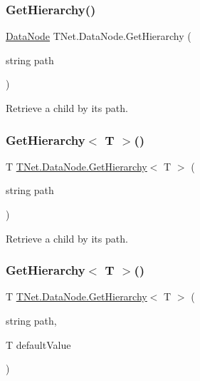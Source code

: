 \subsubsection{\texorpdfstring{Get\+Hierarchy()}{GetHierarchy()}}
{\footnotesize\ttfamily \mbox{\hyperlink{class_t_net_1_1_data_node}{Data\+Node}} T\+Net.\+Data\+Node.\+Get\+Hierarchy (\begin{DoxyParamCaption}\item[{string}]{path }\end{DoxyParamCaption})}



Retrieve a child by its path. 

\mbox{\label{class_t_net_1_1_data_node_a19317391ffe961fd72efb77da1d0df79}} 
\subsubsection{\texorpdfstring{Get\+Hierarchy$<$ T $>$()}{GetHierarchy< T >()}\hspace{0.1cm}{\footnotesize\ttfamily [1/2]}}
{\footnotesize\ttfamily T \mbox{\hyperlink{class_t_net_1_1_data_node_afc1fb219f0560f952f36a13f004b50b1}{T\+Net.\+Data\+Node.\+Get\+Hierarchy}}$<$ T $>$ (\begin{DoxyParamCaption}\item[{string}]{path }\end{DoxyParamCaption})}



Retrieve a child by its path. 

\mbox{\label{class_t_net_1_1_data_node_a4a906909adb289e2b6978033316dcff4}} 
\subsubsection{\texorpdfstring{Get\+Hierarchy$<$ T $>$()}{GetHierarchy< T >()}\hspace{0.1cm}{\footnotesize\ttfamily [2/2]}}
{\footnotesize\ttfamily T \mbox{\hyperlink{class_t_net_1_1_data_node_afc1fb219f0560f952f36a13f004b50b1}{T\+Net.\+Data\+Node.\+Get\+Hierarchy}}$<$ T $>$ (\begin{DoxyParamCaption}\item[{string}]{path,  }\item[{T}]{default\+Value }\end{DoxyParamCaption})}



